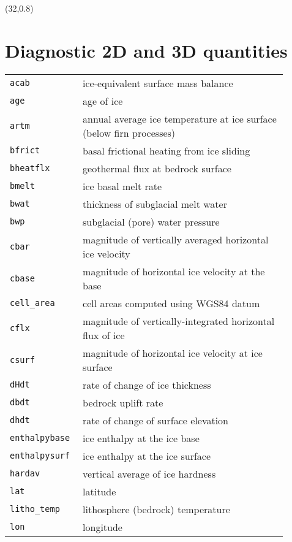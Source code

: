 \documentclass[landscape]{article}
\begin{document}
\begin{textblock}{15}
\end{textblock}

\begin{textblock}{15}(32,0.8)
\section{Diagnostic 2D and 3D quantities}
\label{sec:diagnostics}
\begin{tabular}{@{}p{0.2\linewidth}p{0.7\linewidth}@{}}
  \texttt{acab} &  ice-equivalent surface mass balance\\
  \texttt{age} &  age of ice \\
  \texttt{artm} &  annual average ice temperature at ice surface (below firn processes)\\
  \texttt{bfrict} &  basal frictional heating from ice sliding \\
  \texttt{bheatflx} &  geothermal flux at bedrock surface \\
  \texttt{bmelt} &  ice basal melt rate\\
  \texttt{bwat} &  thickness of subglacial melt water \\
  \texttt{bwp} &  subglacial (pore) water pressure \\
  \texttt{cbar} &  magnitude of vertically averaged horizontal ice velocity \\
  \texttt{cbase} &  magnitude of horizontal ice velocity at the base\\
  \texttt{cell_area} & cell areas computed using WGS84 datum\\
  \texttt{cflx} &  magnitude of vertically-integrated horizontal flux of ice \\
  \texttt{csurf} &  magnitude of horizontal ice velocity at ice surface \\
  \texttt{dHdt} &  rate of change of ice thickness \\
  \texttt{dbdt} &  bedrock uplift rate \\
  \texttt{dhdt} &  rate of change of surface elevation \\
  \texttt{enthalpybase} &  ice enthalpy at the ice base\\
  \texttt{enthalpysurf} &  ice enthalpy at the ice surface\\
  \texttt{hardav} &  vertical average of ice hardness \\
  \texttt{lat} &  latitude \\
  \texttt{litho_temp} &  lithosphere (bedrock) temperature\\
  \texttt{lon} &  longitude \\

\end{tabular}
\end{textblock}
\end{document}
